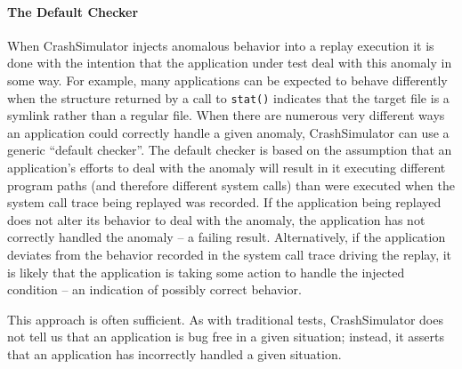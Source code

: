 
    
    \paragraph{The Default Checker}

    When CrashSimulator injects anomalous behavior into a replay execution it is
    done with the intention that the application under test deal with this
    anomaly in some way. For example, many applications
    can be expected to behave differently when
    the structure returned by a call to {\tt stat()} indicates that the target file
    is a symlink rather than a regular file.
    When there are numerous very different ways an
    application could correctly handle a given anomaly, CrashSimulator 
    can use a generic ``default checker''.  The default checker
    is based on the assumption that an application's efforts to deal with the anomaly
    will result in it executing different program paths (and therefore different
    system calls) than were executed when the system call trace being replayed
    was recorded.  If the application being replayed does not
    alter its behavior to deal with the anomaly, the application has not
    correctly handled the anomaly -- a failing result.  Alternatively, if the
    application deviates from the behavior recorded in the system call trace
    driving the replay, it is likely that the application is taking some action
    to handle the injected condition -- an indication of possibly correct
    behavior.

    This approach is often sufficient. %
    As
    with traditional tests, CrashSimulator does not tell us that an application is
    bug free in a given situation; instead, it asserts that an application
    has incorrectly handled a given situation.
    


